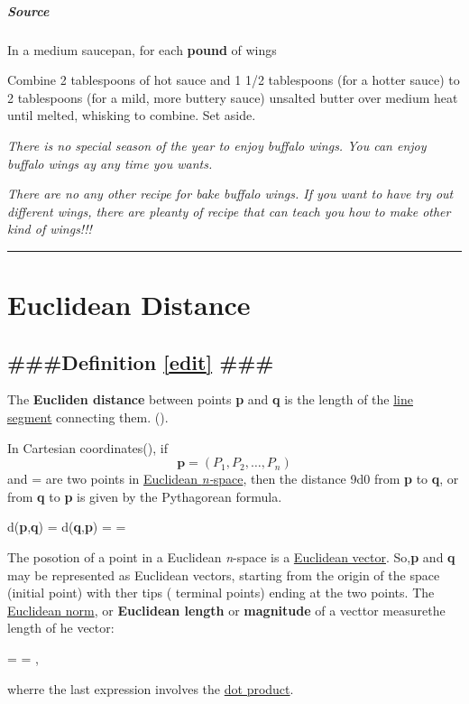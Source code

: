 \documentclass[]{article}
\let\oldsubparagraph\subparagraph
\renewcommand{\subparagraph}[1]{\oldsubparagraph{#1}\mbox{}}
\begin{document}
\subparagraph{Source}\label{source}

In a medium saucepan, for each \textbf{pound} of wings

Combine 2 tablespoons of hot sauce and 1 1/2 tablespoons (for a hotter
sauce) to 2 tablespoons (for a mild, more buttery sauce) unsalted butter
over medium heat until melted, whisking to combine. Set aside.

\emph{There is no special season of the year to enjoy buffalo wings. You
can enjoy buffalo wings ay any time you wants.}

\emph{There are no any other recipe for bake buffalo wings. If you want
to have try out different wings, there are pleanty of recipe that can
teach you how to make other kind of wings!!!}

\begin{center}\rule{0.5\linewidth}{\linethickness}\end{center}

\section{\texorpdfstring{\textbf{Euclidean
Distance}}{Euclidean Distance}}\label{euclidean-distance}

\subsection{\texorpdfstring{\#\#\#Definition \href{}{{[}edit{]}}
\#\#\#}{\#\#\#Definition {[}edit{]} \#\#\#}}\label{definition-edit}

The \textbf{Eucliden distance} between points \textbf{p} and \textbf{q}
is the length of the \href{}{line segment} connecting them.
().

In Cartesian coordinates(), if
\[\boldsymbol{p} = (P_{1}, P_{2},\dotsc,P_{n})\] and  =
are two points in \href{}{Euclidean \emph{n-}space}, then the distance
9d0 from \textbf{p} to \textbf{q}, or from \textbf{q} to \textbf{p} is
given by the Pythagorean formula.

d(\textbf{p},\textbf{q}) = d(\textbf{q},\textbf{p}) =
 =

The posotion of a point in a Euclidean \emph{n}-space is a
\href{}{Euclidean vector}. So,\textbf{p} and \textbf{q} may be
represented as Euclidean vectors, starting from the origin of the space
(initial point) with ther tips ( terminal points) ending at the two
points. The \href{}{Euclidean norm}, or \textbf{Euclidean length} or
\textbf{magnitude} of a vecttor measurethe length of he vector:

 =  =
,

wherre the last expression involves the \href{}{dot product}.
\end{document}
